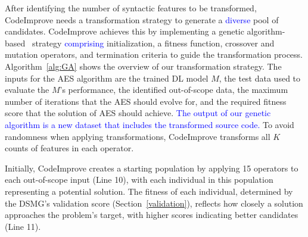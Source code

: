 After identifying the number of syntactic features to be transformed, CodeImprove needs a transformation strategy to generate a \textcolor{blue}{diverse} pool of candidates. CodeImprove achieves this by implementing a genetic algorithm-based~\cite{kumar2010genetic,forrest1996genetic,whitley1994genetic} strategy \textcolor{blue}{comprising} initialization, a fitness function, crossover and mutation operators, and termination criteria to guide the transformation process.  Algorithm~\ref{alg:GA} shows the overview of our transformation strategy. 
The inputs for the AES algorithm are the trained DL model $M$, the test data used to evaluate the $M$'s performance, the identified out-of-scope data, the maximum number of iterations that the AES should evolve for, and the required fitness score that the solution of AES should achieve. \textcolor{blue}{The output of our genetic algorithm is a new dataset that includes the transformed source code.} To avoid randomness when applying transformations, CodeImprove transforms all $K$ counts of features in each operator. 

Initially, CodeImprove creates a starting population by applying 15 operators to each out-of-scope input (Line 10), with each individual in this population representing a potential solution. The fitness of each individual, determined by the DSMG's validation score (Section~\ref{validation}), reflects how closely a solution approaches the problem's target, with higher scores indicating better candidates (Line 11).







